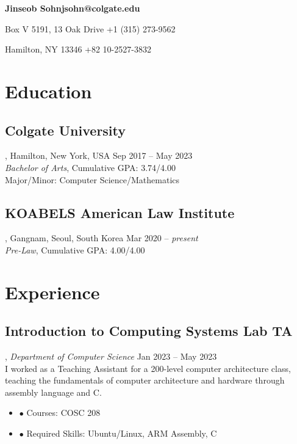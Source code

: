 \documentclass[11pt, letterpaper]{article}
\newenvironment{nitemize}{%
  \begin{itemize}[label={},topsep=0pt,itemsep=0pt,parsep=0pt,leftmargin=*]%
}{%
  \end{itemize}%
}
\begin{document}
\begingroup\centering
\begin{minipage}{\textwidth}
    \textbf{\Large Jinseob Sohn}\hfill\textbf{jsohn@colgate.edu}

        Box V 5191, 13 Oak Drive \hfill +1 (315) 273-9562

        Hamilton, NY 13346 \hfill +82 10-2527-3832
\end{minipage}%
\endgroup
\section{Education}
\subsection{Colgate University}, Hamilton, New York, USA \hfill Sep 2017 – May 2023\\
\emph{Bachelor of Arts}, Cumulative GPA: 3.74/4.00\\
Major/Minor: Computer Science/Mathematics
\subsection{KOABELS American Law Institute}, Gangnam, Seoul, South Korea \hfill Mar 2020 – \emph{present} \\
\emph{Pre-Law}, Cumulative GPA: 4.00/4.00

\section{Experience}
\subsection{Introduction to Computing Systems Lab TA}, \emph{Department of Computer Science} \hfill Jan 2023 – May 2023\\
I worked as a Teaching Assistant for a 200-level computer architecture class, teaching the fundamentals of computer architecture and hardware through assembly language and C.
\begin{nitemize}
    \item \(\bullet\) Courses: COSC 208
    \item \(\bullet\) Required Skills: Ubuntu/Linux, ARM Assembly, C
\end{nitemize}
\end{document}
